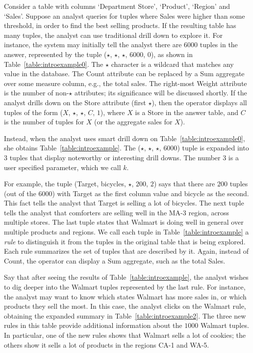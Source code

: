 \begin{example}\label{ex:introexample}
Consider a table with columns `Department Store', `Product', `Region'
and `Sales'. Suppose an analyst queries for tuples
where Sales were higher than some threshold, in order
to find the best selling products.
If the resulting table has many tuples,
the analyst can use traditional drill down to explore it.
For instance, the system may initially tell the analyst there are
6000 tuples in the answer, represented by the tuple ($\star$, $\star$, $\star$, $6000$, $0$),
as shown in Table~\ref{table:introexample0}.
The $\star$ character is a wildcard that matches any value in the database.
The Count attribute can be replaced by a Sum aggregate over some measure column,
e.g., the total sales.
The right-most Weight attribute is the number of non-$\star$ attributes; 
its significance will be discussed shortly.
If the analyst drills down on the Store attribute (first $\star$),
then the operator displays all tuples of the form ($X$, $\star$, $\star$, $C$, $1$),
where $X$ is a Store in the answer table, and $C$
is the number of tuples for $X$ (or the aggregate sales for $X$).

Instead, when the analyst uses smart drill down on Table~\ref{table:introexample0},
she obtains Table~\ref{table:introexample}.
The ($\star$, $\star$, $\star$, $6000$) tuple is expanded into $3$ tuples
that display noteworthy or interesting drill downs.
The number $3$ is a user specified parameter, which we call $k$.

For example, the tuple (Target, bicycles, $\star$, $200$, $2$)
says that there are $200$ tuples (out of the 6000) with
Target as the first column value and bicycle as the second.
This fact tells the analyst that Target is selling a lot of bicycles.
The next tuple tells the analyst that comforters are selling well in
the MA-3 region, across multiple stores. The last tuple
states that Walmart is doing well in general over multiple products and regions.
We call each tuple in Table~\ref{table:introexample} a {\em rule}
to distinguish it from the tuples in the original table that is being explored.
Each rule summarizes the set of tuples that are described by it.
Again, instead of Count, the operator can display a Sum aggregate, such as
the total Sales.


Say that after seeing the results of Table~\ref{table:introexample},
the analyst wishes to dig deeper into the Walmart tuples
represented by the last rule.
For instance, the analyst may want to know
which states Walmart has more sales in, or which products they sell
the most. In this case, the analyst clicks on the Walmart rule,
obtaining the expanded summary in Table~\ref{table:introexample2}.
The three new rules in this table provide additional information
about the $1000$ Walmart tuples.
In particular, one of the new rules shows that
Walmart sells a lot of cookies; the others show it sells a lot of products in
the regions CA-1 and WA-5.


\end{example}
